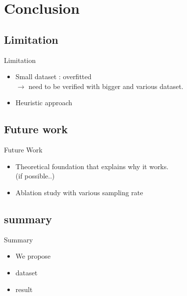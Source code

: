 \section{Conclusion}

\begin{frame}{}
  \subsection{Limitation}
  \begin{block}{Limitation}
    \begin{itemize}
        \item Small dataset : overfitted\\
        $\rightarrow$ need to be verified with bigger and various dataset.
        \item Heuristic approach
    \end{itemize}
  \end{block}
  \bigskip
  \subsection{Future work}
  \begin{block}{Future Work}
    \begin{itemize}
        \item Theoretical foundation that explains why it works.\\
        (if possible..)
        \item Ablation study with various sampling rate
    \end{itemize}
  \end{block}
\end{frame}

\subsection{summary}
\begin{frame}{Summary}
    \begin{itemize}
        \item We propose
        \item dataset
        \item result
    \end{itemize}
\end{frame}